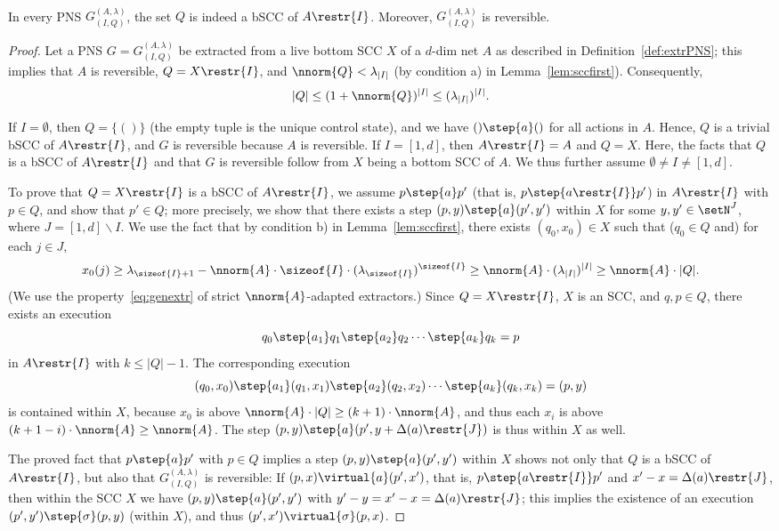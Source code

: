 \begin{prop}\label{prop:condproperPNS}
\hfill \\	
In every PNS ${G^{(A,\lambda)}_{(I,Q)}}$,
	the set ${Q}$ is indeed a
	bSCC of ${A\restr{I}}$. Moreover, ${G^{(A,\lambda)}_{(I,Q)}}$
	is reversible.
\end{prop}	
\begin{proof}
Let a PNS $G={G^{(A,\lambda)}_{(I,Q)}}$ be extracted from a live bottom
	SCC $X$ of a $d$-dim net $A$ as described
	in Definition~\ref{def:extrPNS}; this implies
that $A$ is reversible,	$Q=X\restr{I}$, and $\nnorm{Q}<\lambda_{|I|}$ (by
	condition a) in Lemma~\ref{lem:sccfirst}). Consequently, 
	\[|Q|\leq (1+\nnorm{Q})^{|I|}\leq (\lambda_{|I|})^{|I|}.\]

	If $I=\emptyset$, then $Q=\{()\}$ (the empty tuple is the
	unique
	control state), and we have $()\step{a}()$ for all actions in
	$A$. Hence, $Q$ is a trivial bSCC of $A\restr{I}$, and $G$ is
	reversible because $A$ is reversible.
	If $I=[1,d]$, then $A\restr{I}=A$ and $Q=X$.
	Here, the facts that $Q$ is a bSCC of $A\restr{I}$ and that $G$ is reversible follow from $X$ being a bottom SCC of $A$.
	We thus further assume $\emptyset\neq I\neq[1,d]$.
	
	To prove that  ${Q}=X\restr{I}$ is a bSCC of ${A\restr{I}}$,
we assume $p\step{a}p'$ 
	(that is, $p\step{a\restr{I}}p'$) 
	in $A\restr{I}$ with
	$p\in Q$, and show that $p'\in Q$; more precisely, we show
	that there exists a step 
	$(p,y)\step{a}(p',y')$ within $X$ for some
	$y,y'\in\setN^J$, where $J=[1,d]\smallsetminus I$.
	We use the fact that by condition b) in
	Lemma~\ref{lem:sccfirst}, there exists 
	$(q_0,x_0)\in X$ such that ($q_0\in Q$ and) for each $j\in J$,
	\[
	x_0(j)\geq
		\lambda_{\sizeof{I}+1}-\nnorm{A}\cdot\sizeof{I}\cdot(\lambda_{\sizeof{I}})^{\sizeof{I}}\geq
	\nnorm{A}\cdot (\lambda_{|I|})^{|I|}\geq \nnorm{A}\cdot |Q|.\]
(We use the property~\eqref{eq:genextr} of strict
	$\nnorm{A}$-adapted extractors.)
	Since $Q=X\restr{I}$, $X$ is an SCC, and $q,p\in Q$, there exists an execution 
	\[q_0\step{a_1}q_1\step{a_2}q_2\cdots \step{a_k}q_k=p\] in $A\restr{I}$ 
	with $k\leq |Q|-1$. The corresponding execution
	\[(q_0,x_0)\step{a_1}(q_1,x_1)\step{a_2}(q_2,x_2)\cdots
	\step{a_k}(q_k,x_k)=(p,y)\]
	 is contained within $X$, because $x_0$
	is above $\nnorm{A}\cdot |Q|\geq (k+1)\cdot\nnorm{A}$, and
	thus each $x_i$ is above
	$(k+1-i)\cdot\nnorm{A}\geq\nnorm{A}$.
The step
	$(p,y)\step{a}(p',y+\Delta(a)\restr{J})$ is thus within $X$ as
	well. 

	The proved fact that $p\step{a}p'$ with $p\in Q$ implies  a step $(p,y)\step{a}(p',y')$
	within $X$ shows not only 
	that $Q$ is a bSCC of $A\restr{I}$, but also  
that	${G^{(A,\lambda)}_{(I,Q)}}$ is reversible: 
	If
	$(p,x)\virtual{a}(p',x')$, that is, $p\step{a\restr{I}}p'$ and
	$x'-x=\Delta(a)\restr{J}$, then within the SCC $X$ we have
	$(p,y)\step{a}(p',y')$
	with $y'-y=x'-x=\Delta(a)\restr{J}$; this implies the
	existence of an execution
	$(p',y')\step{\sigma} (p,y)$ (within $X$), and thus
	$(p',x')\virtual{\sigma} (p,x)$.
\end{proof}	

